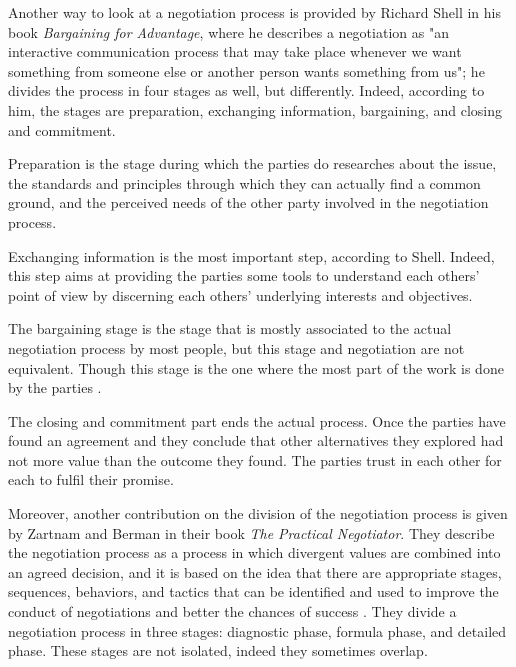 \documentclass[../main.tex]{subfiles}
\begin{document}
Another way to look at a negotiation process is provided by Richard Shell in his book \textit{Bargaining for Advantage}, where he describes a negotiation as "an interactive communication process that may take place whenever we want something from someone else or another person wants something from us"\cite{shell1}; he divides the process in four stages as well, but differently. Indeed, according to him, the stages are preparation, exchanging information, bargaining, and closing and commitment\cite{shell}.

Preparation is the stage during which the parties do researches about the issue, the standards and principles through which they can actually find a common ground, and the perceived needs of the other party involved in the negotiation process.

Exchanging information is the most important step, according to Shell. Indeed, this step aims at providing the parties some tools to understand each others' point of view by discerning each others' underlying interests and objectives.

The bargaining stage is the stage that is mostly associated to the actual negotiation process by most people, but this stage and negotiation are not equivalent. Though this stage is the one where the most part of the work is done by the parties \autocite{culo}.

The closing and commitment part ends the actual process. Once the parties have found an agreement and they conclude that other alternatives they explored had not more value than the outcome they found. The parties trust in each other for each to fulfil their promise. 

Moreover, another contribution on the division of the negotiation process is given by Zartnam and Berman in their book \textit{The Practical Negotiator}. They describe the negotiation process as a process in which divergent values are combined into an agreed decision, and it is based on the idea that there are appropriate stages, sequences, behaviors, and tactics that can be identified and used to improve the conduct of negotiations and better the chances of success \autocite[2]{zartman1982practical}. They divide a negotiation process in three stages: diagnostic phase, formula phase, and detailed phase. These stages are not isolated, indeed they sometimes overlap.
\end{document}
